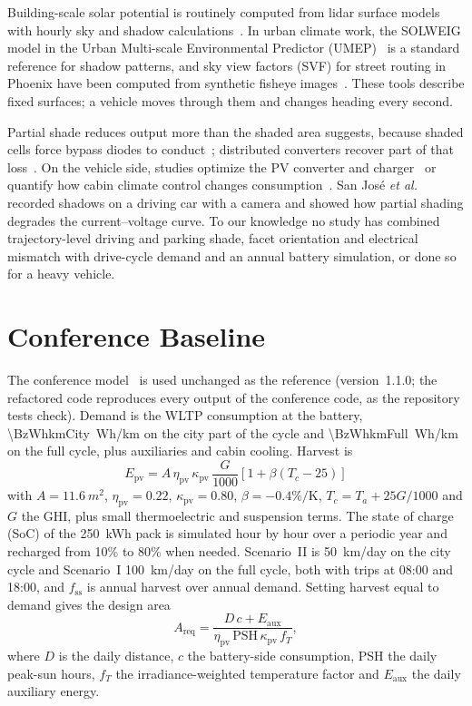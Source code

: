 \documentclass[lettersize,journal]{IEEEtran}
\newcommand{\fss}{f_{\mathrm{ss}}}
\begin{document}
Building-scale solar potential is routinely computed from lidar surface models with hourly sky and shadow calculations~\cite{ref_jakubiec}. In urban climate work, the SOLWEIG model in the Urban Multi-scale Environmental Predictor (UMEP)~\cite{ref_solweig,ref_umep} is a standard reference for shadow patterns, and sky view factors (SVF) for street routing in Phoenix have been computed from synthetic fisheye images~\cite{ref_middel}. These tools describe fixed surfaces; a vehicle moves through them and changes heading every second.

Partial shade reduces output more than the shaded area suggests, because shaded cells force bypass diodes to conduct~\cite{ref_bishop}; distributed converters recover part of that loss~\cite{ref_macalpine}. On the vehicle side, studies optimize the PV converter and charger~\cite{ref_shafiei,ref_yavasoglu} or quantify how cabin climate control changes consumption~\cite{ref_ramsey}. San Jos\'e \emph{et al.}~\cite{ref_sanjose} recorded shadows on a driving car with a camera and showed how partial shading degrades the current--voltage curve. To our knowledge no study has combined trajectory-level driving and parking shade, facet orientation and electrical mismatch with drive-cycle demand and an annual battery simulation, or done so for a heavy vehicle.

\section{Conference Baseline}
\label{sec:baseline}
The conference model~\cite{ref_conf,ref_code} is used unchanged as the reference (version~1.1.0; the refactored code reproduces every output of the conference code, as the repository tests check). Demand is the WLTP consumption at the battery, \SI{\BzWhkmCity}{Wh/km} on the city part of the cycle and \SI{\BzWhkmFull}{Wh/km} on the full cycle, plus auxiliaries and cabin cooling. Harvest is
\begin{equation}
E_{\mathrm{pv}}=A\,\eta_{\mathrm{pv}}\,\kappa_{\mathrm{pv}}\,\frac{G}{1000}\left[1+\beta(T_c-25)\right]
\label{eq:pv}
\end{equation}
with $A=\SI{11.6}{m^2}$, $\eta_{\mathrm{pv}}=0.22$, $\kappa_{\mathrm{pv}}=0.80$, $\beta=-0.4\%/\mathrm{K}$, $T_c=T_a+25G/1000$ and $G$ the GHI, plus small thermoelectric and suspension terms. The state of charge (SoC) of the \SI{250}{kWh} pack is simulated hour by hour over a periodic year and recharged from 10\% to 80\% when needed. Scenario~II is \SI{50}{km/day} on the city cycle and Scenario~I \SI{100}{km/day} on the full cycle, both with trips at 08:00 and 18:00, and $\fss$ is annual harvest over annual demand. Setting harvest equal to demand gives the design area
\begin{equation}
A_{\mathrm{req}}=\frac{D\,c+E_{\mathrm{aux}}}{\eta_{\mathrm{pv}}\,\mathrm{PSH}\,\kappa_{\mathrm{pv}}\,f_T},
\label{eq:areq}
\end{equation}
where $D$ is the daily distance, $c$ the battery-side consumption, PSH the daily peak-sun hours, $f_T$ the irradiance-weighted temperature factor and $E_{\mathrm{aux}}$ the daily auxiliary energy.
\end{document}
